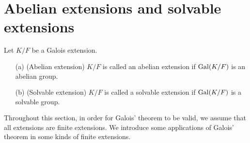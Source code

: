 \section{Abelian extensions and solvable extensions}

\begin{defi}
    Let $K/F$ be a Galois extension.
    \begin{enumerate}
        \item[(a)]
        {
            (Abelian extension)
            $K/F$ is called an abelian extension if ${\textrm{Gal}({K/F})}$ is an abelian group.
        }
        \item[(b)]
        {
            (Solvable extension)
            $K/F$ is called a solvable extension if ${\textrm{Gal}({K/F})}$ is a solvable group.
        }
    \end{enumerate}
\end{defi}

Throughout this section, in order for Galois' theorem to be valid, we assume that all extensions are finite extensions.
We introduce some applications of Galois' theorem in some kinds of finite extensions.

